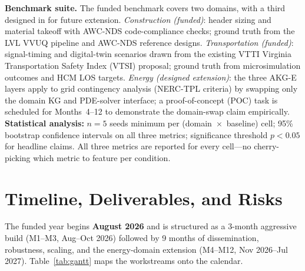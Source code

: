 \documentclass[conference, 10pt]{IEEEtran}
\begin{document}
\textbf{Benchmark suite.} The funded benchmark covers two domains, with a third designed in for future extension. \textit{Construction (funded)}: header sizing and material takeoff with AWC-NDS code-compliance checks; ground truth from the LVL VVUQ pipeline and AWC-NDS reference designs. \textit{Transportation (funded)}: signal-timing and digital-twin scenarios drawn from the existing VTTI Virginia Transportation Safety Index (VTSI) proposal; ground truth from microsimulation outcomes and HCM LOS targets. \textit{Energy (designed extension)}: the three AKG-E layers apply to grid contingency analysis (NERC-TPL criteria) by swapping only the domain KG and PDE-solver interface; a proof-of-concept (POC) task is scheduled for Months~4--12 to demonstrate the domain-swap claim empirically. \textbf{Statistical analysis:} $n=5$ seeds minimum per (domain~$\times$~baseline) cell; 95\% bootstrap confidence intervals on all three metrics; significance threshold $p<0.05$ for headline claims. All three metrics are reported for every cell---no cherry-picking which metric to feature per condition.

\section{Timeline, Deliverables, and Risks}

The funded year begins \textbf{August 2026} and is structured as a 3-month aggressive build (M1--M3, Aug--Oct 2026) followed by 9 months of dissemination, robustness, scaling, and the energy-domain extension (M4--M12, Nov 2026--Jul 2027). Table~\ref{tab:gantt} maps the workstreams onto the calendar.
\end{document}
